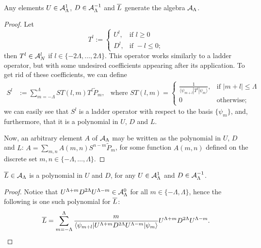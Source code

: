 \begin{lemma}\label{lemmaLUDScalarAngularMomentumGenerateD2}
Any elements $U \in \mathcal A^1_\Lambda$, $D \in \mathcal A^{-1}_\Lambda$ and $\overline{L}$ generate the algebra $\mathcal A_\Lambda$.
\end{lemma}
\begin{proof}
Let
\begin{equation*}
    T^l := 
    \begin{cases}
    U^l, &   \text{if } l \geq 0\\
    D^l, &   \text{if } -l \leq 0;
    \end{cases}
\end{equation*}
then $T^l \in \mathcal A_N^l$ if $l \in \{-2\Lambda, \dots, 2\Lambda\}$. This operator works similarly to a ladder operator, but with some undesired coefficients appearing after its application. To get rid of these coefficients, we can define
\begin{align}\label{equationFormulaGeneralLadderOperatorD2}
    S^l &:= \sum_{m = -\Lambda}^\Lambda ST(l,m) T^l \tilde P_m, & \text{where }
    ST(l,m) =
        \begin{cases}
        \frac{1}{\langle \psi_{m+l}| T^l | \psi_{m}\rangle}, & \text{if } |m+l| \leq \Lambda\\
        0 & \text{otherwise;}
        \end{cases}
\end{align}
we can easily see that $S^l$ is a ladder operator with respect to the basis $\{\psi_m\}$, and, furthermore, that it is a polynomial in $U$, $D$ and $L$.

Now, an arbitrary element $A$ of $\mathcal A_\Lambda$ may be written as the polynomial in $U$, $D$ and $L$: $A =\sum_{m,n} A(m,n) S^{n-m} \tilde P_m$, for some function $A(m,n)$ defined on the discrete set $m,n \in \{-\Lambda, \dots, \Lambda\}$.
\end{proof}

\begin{lemma}\label{lemmaLIsPolynomialOfUpDownLaddersD2}
$\overline{L} \in \mathcal A_\Lambda$ is a polynomial in $U$ and $D$, for any $U \in \mathcal A^1_\Lambda$ and $D \in \mathcal A^{-1}_\Lambda$.
\end{lemma}
\begin{proof}
Notice that $U^{\Lambda+m} D^{2\Lambda}U^{\Lambda-m} \in \mathcal A^0_\Lambda$ for all $m \in \{-\Lambda, \Lambda\}$, hence the following is one such polynomial for $\overline{L}$:
\begin{equation}
    \overline{L} = \sum_{m = -\Lambda}^\Lambda \frac{m}{\langle \psi_{m+l}| U^{\Lambda+m} D^{2\Lambda}U^{\Lambda-m} | \psi_{m}\rangle} U^{\Lambda+m} D^{2\Lambda}U^{\Lambda-m}.
\end{equation}
\end{proof}

